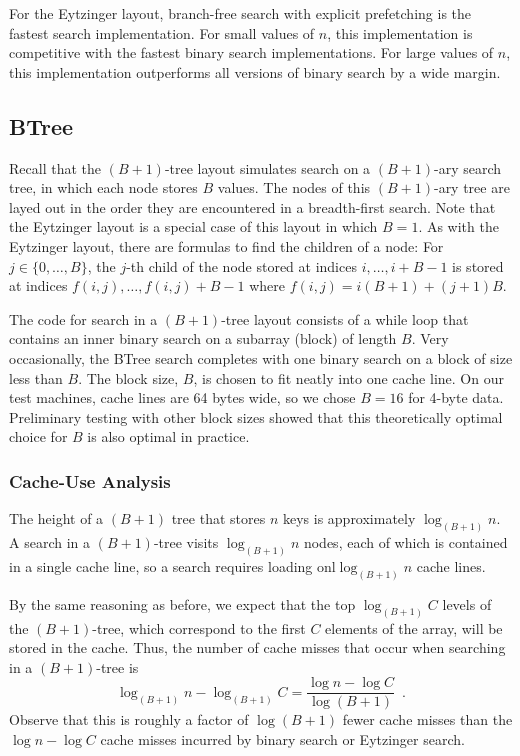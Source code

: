 \documentclass{patmorin}
\begin{document}
\begin{lesson}
  For the Eytzinger layout, branch-free search with explicit prefetching
  is the fastest search implementation. For small values of $n$,
  this implementation is competitive with the fastest binary search
  implementations. For large values of $n$, this implementation
  outperforms all versions of binary search by a wide margin.
\end{lesson}

\subsection{BTree}

Recall that the $(B+1)$-tree layout simulates search on a $(B+1)$-ary
search tree, in which each node stores $B$ values.  The nodes of this
$(B+1)$-ary tree are layed out in the order they are encountered in
a breadth-first search.  Note that the Eytzinger layout is a special
case of this layout in which $B=1$. As with the Eytzinger layout, there
are formulas to find the children of a node: For $j\in\{0,\ldots,B\}$, the
$j$-th child of the node stored at indices $i,\ldots,i+B-1$ is stored
at indices $f(i,j),\ldots,f(i,j)+B-1$ where $f(i,j)=i(B+1)+(j+1)B$.

The code for search in a $(B+1)$-tree layout consists of a while loop
that contains an inner binary search on a subarray (block) of length
$B$. Very occasionally, the BTree search completes with one binary search
on a block of size less than $B$. The block size, $B$, is chosen to fit
neatly into one cache line. On our test machines, cache lines are 64
bytes wide, so we chose $B=16$ for 4-byte data. Preliminary testing with
other block sizes showed that this theoretically optimal choice for $B$
is also optimal in practice.

\subsubsection{Cache-Use Analysis}

The height of a $(B+1)$ tree that stores $n$ keys is approximately
$\log_{(B+1)} n$.  A search in a $(B+1)$-tree visits $\log_{(B+1)} n$
nodes, each of which is contained in a single cache line, so a search
requires loading onl$\log_{(B+1)} n$ cache lines.

By the same reasoning as before, we expect that the top $\log_{(B+1)} C$
levels of the $(B+1)$-tree, which correspond to the first $C$ elements
of the array, will be stored in the cache.  Thus, the number of cache
misses that occur when searching in a $(B+1)$-tree is
\[
    \log_{(B+1)}n - \log_{(B+1)} C 
         = \frac{\log n - \log C}{\log (B+1)} \enspace .
\]
Observe that this is roughly a factor of $\log(B+1)$ fewer cache misses
than the $\log n-\log C$ cache misses incurred by binary search or
Eytzinger search.
\end{document}
